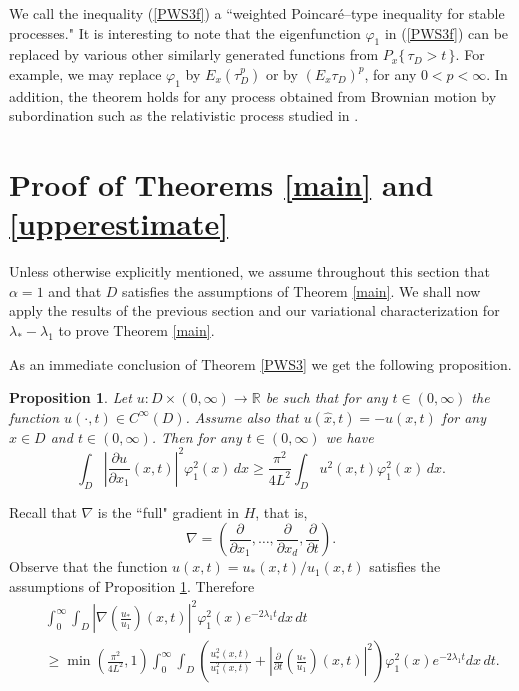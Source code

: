 \documentclass[11pt,leqno]{article}
\newtheorem{prop}{Proposition}[section]
\theoremstyle{definition}
\newcommand{\R}{\mathbb{R}}
\numberwithin{equation}{section}
\begin{document}
We  call the inequality (\ref{PWS3f}) a ``weighted Poincar\'e--type  inequality for stable processes."
It is interesting to note that the 
eigenfunction $\varphi_1$ in  (\ref{PWS3f}) can
 be replaced by various other similarly
 generated functions from $P_x\{ \,\tau_D >t\,\}$.  For example, we may replace $\varphi_1$ by
$E_x(\tau_D^p)$  or by $\left(E_x \tau_D\right)^p$,  for any $0<p<\infty$.  In addition, the
 theorem holds for any process obtained from Brownian motion by subordination such as the 
relativistic process studied  in \cite{R}. 


\section{Proof of Theorems \ref{main} and \ref{upperestimate}}

Unless otherwise explicitly mentioned, we assume throughout this section that 
$\alpha = 1$ and that $D$ satisfies the assumptions of Theorem \ref{main}.  
We shall now apply the results of the previous section and our variational characterization for
$\lambda_*-\lambda_1$ to prove Theorem \ref{main}.

As an immediate conclusion of
Theorem \ref{PWS3} we get the following proposition.
\begin{prop}
\label{PWS4}
Let $u : D \times (0,\infty) \to \R$ be such that for any $t \in (0,\infty)$ the
 function $u(\cdot,t) \in C^{\infty}(D)$. Assume also that $u(\widehat{x},t) = -u(x,t)$ for any
$x \in D$ and $t \in (0,\infty)$.  Then for any $t \in (0,\infty)$ we have
$$
 \int_{D} \left| \frac{\partial u}{\partial x_1}(x,t)\right|^{2} \varphi_{1}^{2}(x) \, dx 
\ge  \frac{\pi^{2}}{4 L^{2}} 
 \int_{D} u^{2}(x,t) \varphi_{1}^{2}(x) \, dx.
$$
\end{prop}
Recall that $\nabla$ is the
``full" gradient in
$H$, that is,  
$$
\nabla = \left(\frac{\partial}{\partial x_{1}}, \ldots, \frac{\partial}{\partial 
x_{d}}, \frac{\partial}{\partial t} \right).
$$
Observe that the function   $u(x,t) = u_*(x,t)/u_1(x,t)$ satisfies the
 assumptions of Proposition \ref{PWS4}. Therefore
\begin{eqnarray}
\label{gradient}
&& \int_{0}^{\infty} \int_{D} \left| \nabla \left( \frac{u_*}{u_1} 
\right) (x,t) \right|^{2} \varphi_{1}^{2}(x) e^{- 2 \lambda_1 t} dx \, dt \\
\nonumber
&& \ge \min \left( \frac{\pi^{2}}{4 L^{2}}, 1 \right) 
\int_{0}^{\infty} \int_{D} \left( \frac{u_*^{2}(x,t)}{u_1^{2}(x,t)} + 
\left| \frac{\partial}{\partial t}\left(\frac{u_*}{u_1}\right)(x,t)\right|^{2}
 \right) \varphi_{1}^{2}(x) e^{- 2 \lambda_1 t} dx \, dt.
\end{eqnarray}
\end{document}
